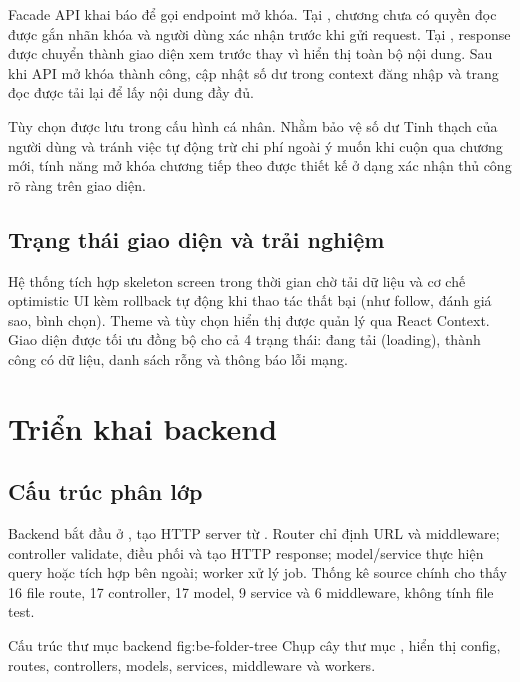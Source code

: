 Facade API khai báo  để gọi endpoint mở khóa. Tại , chương chưa có quyền đọc được gắn nhãn khóa và người dùng xác nhận trước khi gửi request. Tại , response  được chuyển thành giao diện xem trước thay vì hiển thị toàn bộ nội dung. Sau khi API mở khóa thành công,  cập nhật số dư trong context đăng nhập và trang đọc được tải lại để lấy nội dung đầy đủ.

Tùy chọn  được lưu trong cấu hình cá nhân. Nhằm bảo vệ số dư Tinh thạch của người dùng và tránh việc tự động trừ chi phí ngoài ý muốn khi cuộn qua chương mới, tính năng mở khóa chương tiếp theo được thiết kế ở dạng xác nhận thủ công rõ ràng trên giao diện.
\subsection{Trạng thái giao diện và trải nghiệm}

Hệ thống tích hợp skeleton screen trong thời gian chờ tải dữ liệu và cơ chế optimistic UI kèm rollback tự động khi thao tác thất bại (như follow, đánh giá sao, bình chọn). Theme và tùy chọn hiển thị được quản lý qua React Context. Giao diện được tối ưu đồng bộ cho cả 4 trạng thái: đang tải (loading), thành công có dữ liệu, danh sách rỗng và thông báo lỗi mạng.


\section{Triển khai backend}

\subsection{Cấu trúc phân lớp}

Backend bắt đầu ở , tạo HTTP server từ . Router chỉ định URL và middleware; controller validate, điều phối và tạo HTTP response; model/service thực hiện query hoặc tích hợp bên ngoài; worker xử lý job. Thống kê source chính cho thấy 16 file route, 17 controller, 17 model, 9 service và 6 middleware, không tính file test.

  {Cấu trúc thư mục backend}
  {fig:be-folder-tree}
  {Chụp cây thư mục , hiển thị config, routes, controllers, models, services, middleware và workers.}

